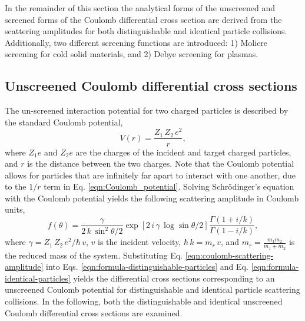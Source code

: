 In the remainder of this section the analytical forms of the unscreened and screened forms of the Coulomb differential cross section are derived from the scattering amplitudes for both distinguishable and identical particle collisions. Additionally, two different screening functions are introduced: 1) Moliere screening for cold solid materials, and 2) Debye screening for plasmas.

\subsection{Unscreened Coulomb differential cross sections}
The un-screened interaction potential for two charged particles is described by the standard Coulomb potential,
\begin{equation} \label{eqn:Coulomb_potential}
    V(r) = \dfrac{Z_1 \, Z_2 \, e^2}{r},
\end{equation}
where $Z_1 e$ and $Z_2 e$ are the charges of the incident and target charged particles, and $r$ is the distance between the two charges. Note that the Coulomb potential allows for particles that are infinitely far apart to interact with one another, due to the $1/r$ term in Eq. \eqref{eqn:Coulomb_potential}. Solving Schr\"{o}dinger's equation with the Coulomb potential yields the following scattering amplitude in Coulomb units,
\begin{equation} \label{eqn:coulomb-scattering-amplitude}
    f(\theta) = \dfrac{\gamma}{2 \, k \, \sin^2 \theta/2} \exp \left[ 2 \, i \, \gamma \, \log \sin \theta/2 \right] \dfrac{\Gamma(1 + i/k)}{\Gamma(1 - i/k)},
\end{equation}
where $\gamma = Z_1 \, Z_2 \, e^2 / \hbar \, v$, $v$ is the incident velocity, $\hbar \, k = m_r \, v$, and $m_r = \frac{m_1 m_2}{m_1 + m_2}$ is the reduced mass of the system. Substituting Eq. \eqref{eqn:coulomb-scattering-amplitude} into Eqs. \eqref{eqn:formula-distinguishable-particles} and Eq. \eqref{eqn:formula-identical-particles} yields the differential cross sections corresponding to an unscreened Coulomb potential for distinguishable and identical particle scattering collisions. In the following, both the distinguishable and identical unscreened Coulomb differential cross sections are examined.

